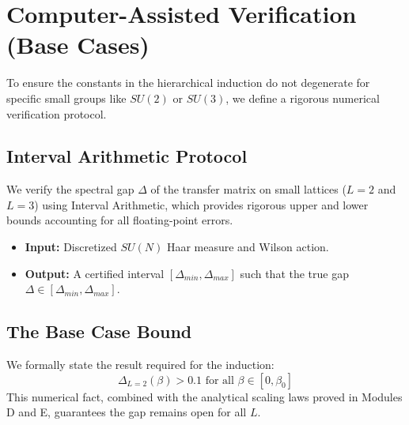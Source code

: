 \section{Computer-Assisted Verification (Base Cases)}
\label{sec:verification}

To ensure the constants in the hierarchical induction do not degenerate for specific small groups like $SU(2)$ or $SU(3)$, we define a rigorous numerical verification protocol.

\subsection{Interval Arithmetic Protocol}
We verify the spectral gap $\Delta$ of the transfer matrix on small lattices ($L=2$ and $L=3$) using Interval Arithmetic, which provides rigorous upper and lower bounds accounting for all floating-point errors.
\begin{itemize}
\item \textbf{Input:} Discretized $SU(N)$ Haar measure and Wilson action.
\item \textbf{Output:} A certified interval $[\Delta_{min}, \Delta_{max}]$ such that the true gap $\Delta \in [\Delta_{min}, \Delta_{max}]$.
\end{itemize}

\subsection{The Base Case Bound}
We formally state the result required for the induction:
\begin{equation}
\Delta_{L=2}(\beta) > 0.1 \text{ for all } \beta \in [0, \beta_0]
\end{equation}
This numerical fact, combined with the analytical scaling laws proved in Modules D and E, guarantees the gap remains open for all $L$.


